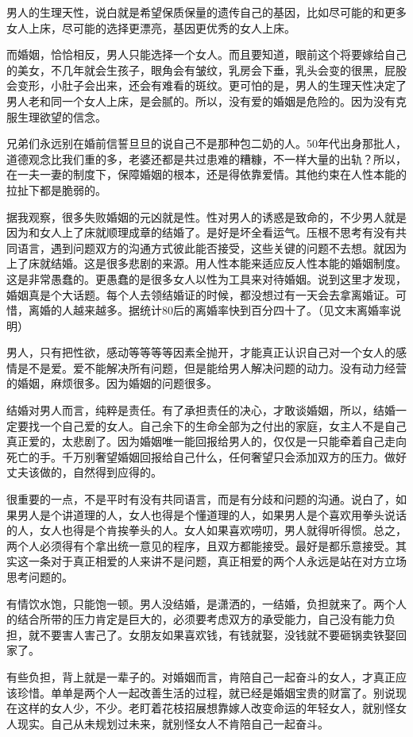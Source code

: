 \documentclass[punct=kaiming, zihao=5, openany, fontset=sikou]{ctexbook}
\begin{document}
男人的生理天性，说白就是希望保质保量的遗传自己的基因，比如尽可能的和更多女人上床，尽可能的选择更漂亮，基因更优秀的女人上床。

而婚姻，恰恰相反，男人只能选择一个女人。而且要知道，眼前这个将要嫁给自己的美女，不几年就会生孩子，眼角会有皱纹，乳房会下垂，乳头会变的很黑，屁股会变形，小肚子会出来，还会有难看的斑纹。更可怕的是，男人的生理天性决定了男人老和同一个女人上床，是会腻的。所以，没有爱的婚姻是危险的。因为没有克服生理欲望的信念。

兄弟们永远别在婚前信誓旦旦的说自己不是那种包二奶的人。50年代出身那批人，道德观念比我们重的多，老婆还都是共过患难的糟糠，不一样大量的出轨？所以，在一夫一妻的制度下，保障婚姻的根本，还是得依靠爱情。其他约束在人性本能的拉扯下都是脆弱的。

据我观察，很多失败婚姻的元凶就是性。性对男人的诱惑是致命的，不少男人就是因为和女人上了床就顺理成章的结婚了。是好是坏全看运气。压根不思考有没有共同语言，遇到问题双方的沟通方式彼此能否接受，这些关键的问题不去想。就因为上了床就结婚。这是很多悲剧的来源。用人性本能来适应反人性本能的婚姻制度。这是非常愚蠢的。更愚蠢的是很多女人以性为工具来对待婚姻。说到这里才发现，婚姻真是个大话题。每个人去领结婚证的时候，都没想过有一天会去拿离婚证。可惜，离婚的人越来越多。据统计80后的离婚率快到百分四十了。（见文末离婚率说明）

男人，只有把性欲，感动等等等等因素全抛开，才能真正认识自己对一个女人的感情是不是爱。爱不能解决所有问题，但是能给男人解决问题的动力。没有动力经营的婚姻，麻烦很多。因为婚姻的问题很多。

结婚对男人而言，纯粹是责任。有了承担责任的决心，才敢谈婚姻，所以，结婚一定要找一个自己爱的女人。自己余下的生命全部为之付出的家庭，女主人不是自己真正爱的，太悲剧了。因为婚姻唯一能回报给男人的，仅仅是一只能牵着自己走向死亡的手。千万别奢望婚姻回报给自己什么，任何奢望只会添加双方的压力。做好丈夫该做的，自然得到应得的。

很重要的一点，不是平时有没有共同语言，而是有分歧和问题的沟通。说白了，如果男人是个讲道理的人，女人也得是个懂道理的人，如果男人是个喜欢用拳头说话的人，女人也得是个肯挨拳头的人。女人如果喜欢唠叨，男人就得听得惯。总之，两个人必须得有个拿出统一意见的程序，且双方都能接受。最好是都乐意接受。其实这一条对于真正相爱的人来讲不是问题，真正相爱的两个人永远是站在对方立场思考问题的。

有情饮水饱，只能饱一顿。男人没结婚，是潇洒的，一结婚，负担就来了。两个人的结合所带的压力肯定是巨大的，必须要考虑双方的承受能力，自己没有能力负担，就不要害人害己了。女朋友如果喜欢钱，有钱就娶，没钱就不要砸锅卖铁娶回家了。

有些负担，背上就是一辈子的。对婚姻而言，肯陪自己一起奋斗的女人，才真正应该珍惜。单单是两个人一起改善生活的过程，就已经是婚姻宝贵的财富了。别说现在这样的女人少，不少。老盯着花枝招展想靠嫁人改变命运的年轻女人，就别怪女人现实。自己从未规划过未来，就别怪女人不肯陪自己一起奋斗。
\end{document}
